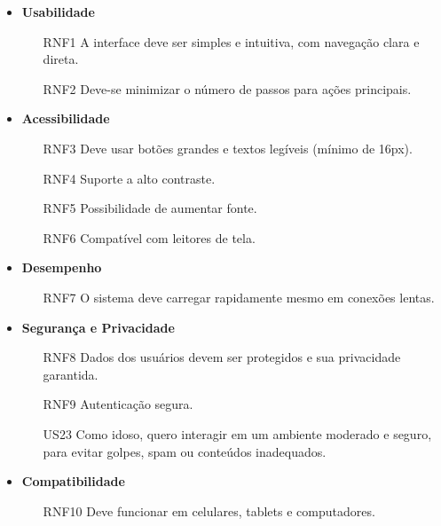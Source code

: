 \begin{itemize}
    \item \textbf{Usabilidade}
        \begin{enumerate}
            \item [RNF1] A interface deve ser simples e intuitiva, com navegação clara e direta.
            \item [RNF2] Deve-se minimizar o número de passos para ações principais.
        \end{enumerate}
 
    \item \textbf{Acessibilidade}
        \begin{enumerate}
            \item [RNF3] Deve usar botões grandes e textos legíveis (mínimo de 16px).
            \item [RNF4] Suporte a alto contraste.
            \item [RNF5] Possibilidade de aumentar fonte.
            \item [RNF6] Compatível com leitores de tela.
        \end{enumerate}
 
    \item \textbf{Desempenho}
        \begin{enumerate}
            \item [RNF7] O sistema deve carregar rapidamente mesmo em conexões lentas.
        \end{enumerate}
 
    \item \textbf{Segurança e Privacidade}
        \begin{enumerate}
            \item [RNF8] Dados dos usuários devem ser protegidos e sua privacidade garantida.
            \item [RNF9] Autenticação segura.
            \item [US23] Como idoso, quero interagir em um ambiente moderado e seguro, para evitar golpes, spam ou conteúdos inadequados.
        \end{enumerate}
 
    \item \textbf{Compatibilidade}
        \begin{enumerate}
            \item [RNF10] Deve funcionar em celulares, tablets e computadores.
        \end{enumerate}
\end{itemize}